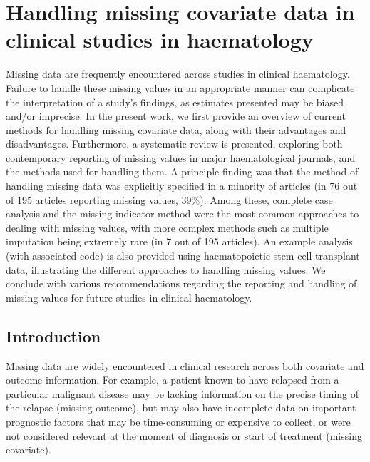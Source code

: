 \documentclass[
  letterpaper,
  DIV=11,
  numbers=noendperiod]{scrreprt}
\begin{document}

\hypertarget{handling-missing-covariate-data-in-clinical-studies-in-haematology}{%
\chapter{Handling missing covariate data in clinical studies in
haematology}\label{handling-missing-covariate-data-in-clinical-studies-in-haematology}}

Missing data are frequently encountered across studies in clinical
haematology. Failure to handle these missing values in an appropriate
manner can complicate the interpretation of a study's findings, as
estimates presented may be biased and/or imprecise. In the present work,
we first provide an overview of current methods for handling missing
covariate data, along with their advantages and disadvantages.
Furthermore, a systematic review is presented, exploring both
contemporary reporting of missing values in major haematological
journals, and the methods used for handling them. A principle finding
was that the method of handling missing data was explicitly specified in
a minority of articles (in 76 out of 195 articles reporting missing
values, 39\%). Among these, complete case analysis and the missing
indicator method were the most common approaches to dealing with missing
values, with more complex methods such as multiple imputation being
extremely rare (in 7 out of 195 articles). An example analysis (with
associated code) is also provided using haematopoietic stem cell
transplant data, illustrating the different approaches to handling
missing values. We conclude with various recommendations regarding the
reporting and handling of missing values for future studies in clinical
haematology.

\hfill\break

\hypertarget{introduction}{%
\section{Introduction}\label{introduction}}

Missing data are widely encountered in clinical research across both
covariate and outcome information. For example, a patient known to have
relapsed from a particular malignant disease may be lacking information
on the precise timing of the relapse (missing outcome), but may also
have incomplete data on important prognostic factors that may be
time-consuming or expensive to collect, or were not considered relevant
at the moment of diagnosis or start of treatment (missing covariate).
\end{document}
